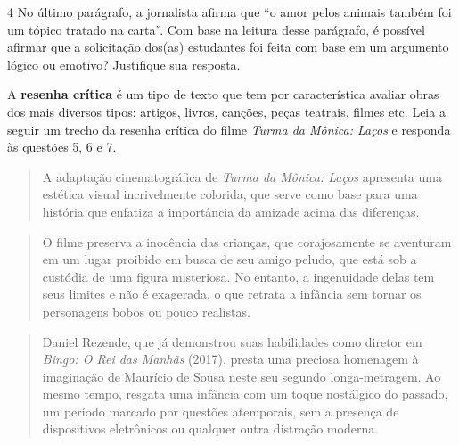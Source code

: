 {

\num{4} No último parágrafo, a jornalista afirma que ``o amor pelos
animais também foi um tópico tratado na carta''. Com base na leitura
desse parágrafo, é possível afirmar que a solicitação dos(as) estudantes
foi feita com base em um argumento lógico ou emotivo? Justifique sua
resposta.


A \textbf{resenha crítica} é um tipo de texto que tem por característica
avaliar obras dos mais diversos tipos: artigos, livros, canções, peças
teatrais, filmes etc. Leia a seguir um trecho da resenha crítica do
filme \emph{Turma da Mônica: Laços} e responda às questões 5, 6 e 7.

\begin{quote}
A adaptação cinematográfica de \emph{Turma da Mônica: Laços} apresenta
uma estética visual incrivelmente colorida, que serve como base para uma
história que enfatiza a importância da amizade acima das diferenças.
\end{quote}

\begin{quote}
O filme preserva a inocência das crianças, que corajosamente se
aventuram em um lugar proibido em busca de seu amigo peludo, que está
sob a custódia de uma figura misteriosa. No entanto, a ingenuidade delas
tem seus limites e não é exagerada, o que retrata a infância sem tornar
os personagens bobos ou pouco realistas.
\end{quote}

\begin{quote}
Daniel Rezende, que já demonstrou suas habilidades como diretor em
\emph{Bingo: O Rei das Manhãs} (2017), presta uma preciosa homenagem à
imaginação de Maurício de Sousa neste seu segundo longa-metragem. Ao
mesmo tempo, resgata uma infância com um toque nostálgico do passado, um
período marcado por questões atemporais, sem a presença de dispositivos
eletrônicos ou qualquer outra distração moderna.
\end{quote}

}
